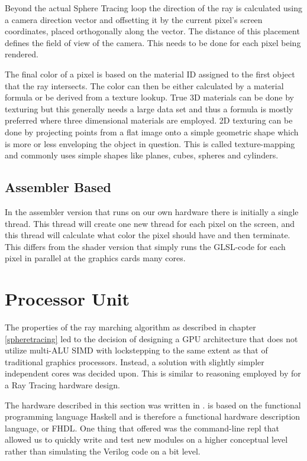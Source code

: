 			Beyond the actual Sphere Tracing loop the direction of the ray is
			calculated using a camera direction vector and offsetting it by the
			current pixel's screen coordinates, placed orthogonally along the
			vector.  The distance of this placement defines the field of view
			of the camera. This needs to be done for each pixel being rendered.
			
			The final color of a pixel is based on the material ID assigned to
			the first object that the ray intersects. The color can then be
			either calculated by a material formula or be derived from a
			texture lookup. True 3D materials can be done by texturing but this
			generally needs a large data set and thus a formula is mostly
			preferred where three dimensional materials are employed. 2D
			texturing can be done by projecting points from a flat image onto a
			simple geometric shape  which is more or less enveloping the object
			in question. This is called texture-mapping and commonly uses
			simple shapes like planes, cubes, spheres and cylinders. 
			

		\subsection{Assembler Based}

			In the assembler version that runs on our own hardware there is
			initially a single thread. This thread will create one new thread
			for each pixel on the screen, and this thread will calculate what 
			color the pixel should have and then terminate. This differs from 
			the shader version that simply runs the GLSL-code for each pixel
			in parallel at the graphics cards many cores.

	\section{Processor Unit} \label{implproc}

		The properties of the ray marching algorithm as described in chapter
		\ref{spheretracing} led to the decision of designing a GPU architecture
		that does not utilize multi-ALU SIMD with lockstepping to the same
		extent as that of traditional graphics processors. Instead, a solution 
		with slightly simpler independent cores was decided upon. This is 
		similar to reasoning employed by \cite{Woop2005} for a Ray Tracing 
		hardware design.

		The hardware described in this section was written in \clash. \clash is
		based on the functional programming language Haskell and is therefore a
		functional hardware description language, or FHDL. One thing that
		\clash offered was the command-line repl that allowed us to quickly
		write and test new modules on a higher conceptual level rather than
		simulating the Verilog code on a bit level.

